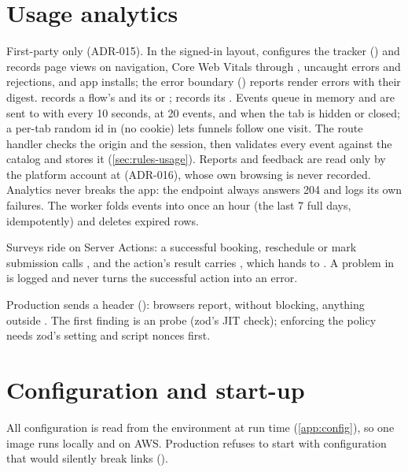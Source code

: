 \section{Usage analytics}\label{sec:usage-analytics}
First-party only (ADR-015). In the signed-in layout,  configures the tracker
() and records page views on navigation, Core Web Vitals through
, uncaught errors and rejections, and app installs; the 
error boundary () reports render errors with their digest.
 records a flow's  and its  or
;  records its . Events queue in memory and are sent to
 with  every 10 seconds, at 20 events, and when the tab is
hidden or closed; a per-tab random id in  (no cookie) lets funnels follow one
visit. The route handler checks the origin and the session, then  validates
every event against the catalog and stores it (\cref{sec:rules-usage}). Reports and feedback are
read only by the platform account at  (ADR-016), whose own browsing is never
recorded. Analytics never breaks
the app: the endpoint always answers 204 and logs its own failures. The worker folds events into
 once an hour (the last 7 full days, idempotently) and deletes expired rows.

Surveys ride on Server Actions: a successful booking, reschedule or mark submission calls
, and the action's result carries , which  hands
to . A problem in  is logged and never turns the successful
action into an error.

Production sends a  header ():
browsers report, without blocking, anything outside . The first finding is an
 probe (zod's JIT check); enforcing the policy needs zod's  setting and
script nonces first.

\section{Configuration and start-up}
All configuration is read from the environment at run time (\cref{app:config}), so one image runs
locally and on AWS. Production refuses to start with configuration that would silently
break links ().

